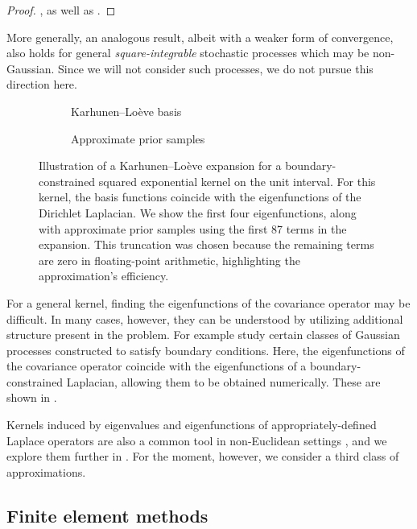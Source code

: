 \documentclass[11pt]{book}
\begin{document}
\begin{proof}
\textcite[Theorem 5.28]{lord14}, as well as \textcite[Section 2.3.2]{ghanem91}.
\end{proof}

More generally, an analogous result, albeit with a weaker form of convergence, also holds for general \emph{square-integrable} stochastic processes which may be non-Gaussian.
Since we will not consider such processes, we do not pursue this direction here.

\begin{figure}
\begin{subfigure}{0.49\textwidth}

\caption{Karhunen--Loève basis}
\end{subfigure}
\begin{subfigure}{0.49\textwidth}

\caption{Approximate prior samples}
\end{subfigure}
\caption[Karhunen--Loève prior approximations]{Illustration of a Karhunen--Loève expansion for a boundary-constrained squared exponential kernel on the unit interval.
For this kernel, the basis functions coincide with the eigenfunctions of the Dirichlet Laplacian.
We show the first four eigenfunctions, along with approximate prior samples using the first 87 terms in the expansion. This truncation was chosen because the remaining terms are zero in floating-point arithmetic, highlighting the approximation's efficiency.}
\label{fig:gp-kl}
\end{figure}

For a general kernel, finding the eigenfunctions of the covariance operator may be difficult.
In many cases, however, they can be understood by utilizing additional structure present in the problem.
For example \textcite{solin19} study certain classes of Gaussian processes constructed to satisfy boundary conditions.
Here, the eigenfunctions of the covariance operator coincide with the eigenfunctions of a boundary-constrained Laplacian, allowing them to be obtained numerically.
These are shown in .

Kernels induced by eigenvalues and eigenfunctions of appropriately-defined Laplace operators are also a common tool in non-Euclidean settings \cite{solin18,solin20,coveney20}, and we explore them further in .
For the moment, however, we consider a third class of approximations.

\subsection{Finite element methods}
\end{document}
